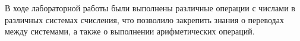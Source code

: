 \documentclass[oneside,a4paper,14pt]{extarticle} %
\begin{document}
   В ходе лабораторной работы были выполнены различные операции с числами в различных системах счисления, что позволило закрепить знания о переводах между системами, а также о выполнении арифметических операций.\\
\end{document}
